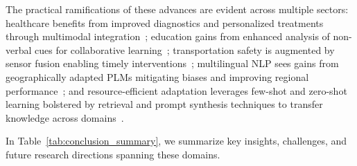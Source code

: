 \documentclass[sigconf]{acmart}
\begin{document}
The practical ramifications of these advances are evident across multiple sectors: healthcare benefits from improved diagnostics and personalized treatments through multimodal integration~\cite{ref21}; education gains from enhanced analysis of non-verbal cues for collaborative learning~\cite{ref22}; transportation safety is augmented by sensor fusion enabling timely interventions~\cite{ref27}; multilingual NLP sees gains from geographically adapted PLMs mitigating biases and improving regional performance~\cite{ref30,ref31}; and resource-efficient adaptation leverages few-shot and zero-shot learning bolstered by retrieval and prompt synthesis techniques to transfer knowledge across domains~\cite{ref34,ref40}.

In Table~\ref{tab:conclusion_summary}, we summarize key insights, challenges, and future research directions spanning these domains.
\end{document}

